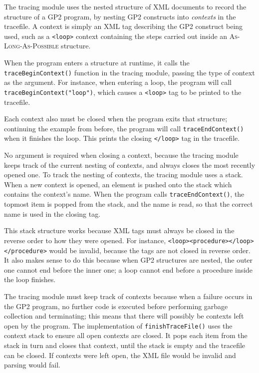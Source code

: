 \documentclass[authoryearcitations]{UoYCSproject}
\begin{document}
The tracing module uses the nested structure of XML documents to record the
structure of a GP2 program, by nesting GP2 constructs into \emph{contexts} in the
tracefile. A context is simply an XML tag describing the GP2 construct being
used, such as a \texttt{<loop>} context containing the steps carried out inside
an \textsc{As-Long-As-Possible} structure.

When the program enters a structure at runtime, it calls the \texttt{traceBeginContext()}
function in the tracing module, passing the type of context as the argument.
For instance, when entering a loop, the program will call
\texttt{traceBeginContext("loop")}, which causes a \texttt{<loop>} tag to be
printed to the tracefile.

Each context also must be closed when the program exits that structure; continuing
the example from before, the program will call \texttt{traceEndContext()} when it
finishes the loop. This prints the closing \texttt{</loop>} tag in the tracefile.

No argument is required when closing a context, because the tracing module keeps
track of the current nesting of contexts, and always closes the most recently
opened one. To track the nesting of contexts, the tracing module uses a stack.
When a new context is opened, an element is pushed onto the stack which contains
the context's name. When the program calls \texttt{traceEndContext()}, the
topmost item is popped from the stack, and the name is read, so that the correct
name is used in the closing tag.

This stack structure works because XML tags must always be closed in the reverse
order to how they were opened. For instance, \texttt{<loop><procedure></loop></procedure>}
would be invalid, because the tags are not closed in reverse order. It also makes
sense to do this because when GP2 structures are nested, the outer one cannot end
before the inner one; a loop cannot end before a procedure inside the loop finishes.

The tracing module must keep track of contexts because when a failure occurs in
the GP2 program, no further code is executed before performing garbage collection
and terminating; this means that there will possibly be contexts left open by
the program. The implementation of \texttt{finishTraceFile()} uses the context
stack to ensure all open contexts are closed. It pops each item from the stack
in turn and closes that context, until the stack is empty and the tracefile can
be closed. If contexts were left open, the XML file would be invalid and parsing
would fail.
\end{document}
